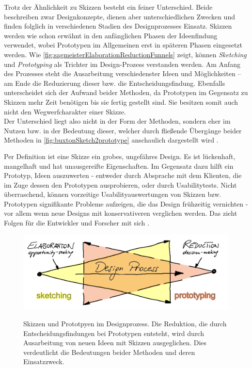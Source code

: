 \medskip Trotz der Ähnlichkeit zu Skizzen besteht ein feiner Unterschied. Beide beschreiben zwar Designkonzepte, dienen aber unterschiedlichen Zwecken und finden folglich in verschiedenen Stadien des Designprozesses Einsatz. Skizzen werden wie schon erwähnt in den anfänglichen Phasen	der	Ideenfindung verwendet, wobei Prototypen im	Allgemeinen	erst in späteren Phasen eingesetzt werden. Wie \autoref{fig:sagmeisterElaborationReductionFunnels} zeigt, können \emph{Sketching} und \emph{Prototyping} als Trichter im Design-Prozess verstanden werden. Am Anfang des Prozesses steht die Ausarbeitung verschiedenster Ideen und Möglichkeiten – am Ende die Reduzierung dieser bzw. die Entscheidungsfindung.
Ebenfalls unterscheidet sich der Aufwand beider Methoden, da Prototypen im Gegensatz zu Skizzen mehr Zeit benötigen bis sie fertig gestellt sind. Sie besitzen somit auch nicht den Wegwerfcharakter einer Skizze. \\
Der Unterschied liegt also nicht in	der	Form der Methoden, sondern eher im Nutzen bzw. in der Bedeutung dieser,	welcher	durch fließende Übergänge beider Methoden in \autoref{fig:buxtonSketch2prototype} anschaulich dargestellt wird \citep{Sagmeister:2008}.

\medskip Per Definition ist eine Skizze ein grobes, ungefähres Design. Es ist lückenhaft, mangelhaft und hat unausgereifte Eigenschaften. Im Gegensatz dazu hilft ein Prototyp, Ideen auszuwerten - entweder durch Absprache mit dem Klienten, die im Zuge dessen den Prototypen ausprobieren, oder durch Usabilitytests. Nicht überraschend, können vorzeitige Usabilityauswertungen von Skizzen bzw. Prototypen signifikante Probleme aufzeigen, die das Design frühzeitig vernichten - vor allem wenn neue Designs mit konservativeren verglichen werden. Das zieht Folgen für die Entwickler und Forscher mit sich \citep{Greenberg:2008}.
	
\begin{figure}
	\begin{center}
        {\includegraphics[width=\linewidth]{gfx/sagmeisterElaborationReductionFunnels}}
	\end{center}
		\caption[Skizzen und Prototpyen im Designprozess. \newline \citep{Sagmeister:2008}]{Skizzen und Prototpyen im Designprozess. Die Reduktion, die durch Entscheidungsfindungen bei Prototypen entsteht, wird durch Ausarbeitung von neuen Ideen mit Skizzen ausgeglichen. Dies verdeutlicht die Bedeutungen beider Methoden und deren Einsatzzweck.}\label{fig:sagmeisterElaborationReductionFunnels}
\end{figure}

